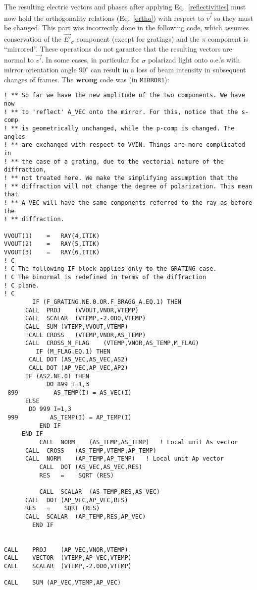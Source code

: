 \documentclass[a4paper,10pt]{article}
\begin{document}
The resulting electric vectors and phases after applying Eq.~\ref{reflectivities} must now hold
the orthogonality relations (Eq.~\ref{ortho}) with respect to $\vec{v'}$ so they must be changed. 
\color{red}
This part was incorrectly
done in the following code, which assumes conservation of the $\vec{E'}_\sigma$ component (except for gratings)
and the $\pi$ component is ``mirrored''. These operations do not garantee that the resulting 
vectors are normal to $\vec{v'}$. In some cases, in particular for $\sigma$ polarizad light onto 
o.e.'s with mirror orientation angle $90^\circ$ can result in a loss of beam intensity in 
subsequent changes of frames. The {\bf wrong} code was (in {\tt MIRROR1}): 
\color{black}

\begin{lstlisting}
! ** So far we have the new amplitude of the two components. We have now
! ** to 'reflect' A_VEC onto the mirror. For this, notice that the s-comp
! ** is geometrically unchanged, while the p-comp is changed. The angles
! ** are exchanged with respect to VVIN. Things are more complicated in
! ** the case of a grating, due to the vectorial nature of the diffraction,
! ** not treated here. We make the simplifying assumption that the
! ** diffraction will not change the degree of polarization. This mean that
! ** A_VEC will have the same components referred to the ray as before the
! ** diffraction. 

VVOUT(1)	=   RAY(4,ITIK)
VVOUT(2)	=   RAY(5,ITIK)
VVOUT(3)	=   RAY(6,ITIK)
! C 
! C The following IF block applies only to the GRATING case.
! C The binormal is redefined in terms of the diffraction
! C plane.
! C
     	IF (F_GRATING.NE.0.OR.F_BRAGG_A.EQ.1) THEN
	  CALL	PROJ	(VVOUT,VNOR,VTEMP)
	  CALL	SCALAR	(VTEMP,-2.0D0,VTEMP)
	  CALL	SUM	(VTEMP,VVOUT,VTEMP)
	  !CALL	CROSS	(VTEMP,VNOR,AS_TEMP)
	  CALL	CROSS_M_FLAG	(VTEMP,VNOR,AS_TEMP,M_FLAG)
     	 IF (M_FLAG.EQ.1) THEN
	   CALL	DOT	(AS_VEC,AS_VEC,AS2)
	   CALL	DOT	(AP_VEC,AP_VEC,AP2)
	  IF (AS2.NE.0)	THEN
     	    DO 899 I=1,3
 899          AS_TEMP(I) = AS_VEC(I)
	  ELSE
	   DO 999 I=1,3
 999	     AS_TEMP(I) = AP_TEMP(I)
     	  END IF
	 END IF
     	  CALL	NORM  	(AS_TEMP,AS_TEMP)	! Local unit As vector
	  CALL	CROSS	(AS_TEMP,VTEMP,AP_TEMP)
	  CALL	NORM	(AP_TEMP,AP_TEMP)	! Local unit Ap vector
     	  CALL	DOT	(AS_VEC,AS_VEC,RES)
     	  RES	=    SQRT (RES)

     	  CALL	SCALAR	(AS_TEMP,RES,AS_VEC)
	  CALL	DOT	(AP_VEC,AP_VEC,RES)
	  RES	=    SQRT (RES)
	  CALL	SCALAR	(AP_TEMP,RES,AP_VEC)
     	END IF


CALL	PROJ	(AP_VEC,VNOR,VTEMP)
CALL	VECTOR	(VTEMP,AP_VEC,VTEMP)
CALL	SCALAR	(VTEMP,-2.0D0,VTEMP)

CALL	SUM	(AP_VEC,VTEMP,AP_VEC)
\end{lstlisting}
\end{document}
